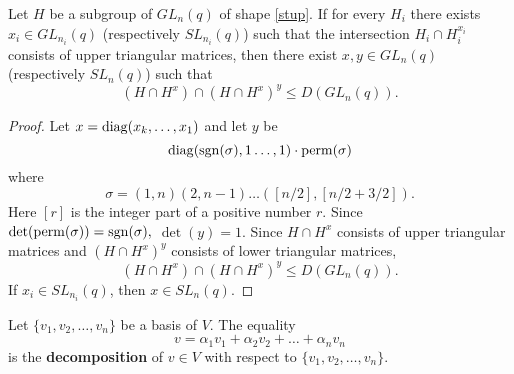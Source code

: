 \begin{Lem}\label{irrtog}
Let $H$ be a subgroup of $GL_n(q)$ of shape \eqref{stup}. If for every $H_i$ there exists $x_i \in GL_{n_i}(q)$ (respectively $SL_{n_i}(q)$) such that the intersection $H_i \cap H_i^{x_i}$ consists of upper triangular matrices, then there exist $x,y \in GL_n(q)$ (respectively $SL_n(q)$) such that 
$$(H\cap H^x) \cap (H\cap H^x)^y \le D(GL_n(q)).$$
\end{Lem}
\begin{proof}
Let $x=\mathrm{diag}(x_k, \ldots, x_1)$ and let $y$ be $$\mathrm{diag}(\mathrm{sgn}(\sigma),1 \ldots,1) \cdot \mathrm{perm}(\sigma)$$ where  $$\sigma =(1,n)(2, n-1) \ldots ([n/2], [n/2+3/2]).$$ Here $[r]$ is the integer part of a positive number $r$. Since $\det(\mathrm{perm}(\sigma))=\mathrm{sgn}(\sigma),$ $\det(y)=1.$ Since
$H\cap H^x$ consists of upper triangular matrices and $(H\cap H^x)^y$ consists of lower triangular matrices, 
\begin{equation*}
(H\cap H^x) \cap (H\cap H^x)^y \le D(GL_n(q)). %
\end{equation*} 
If $x_i \in SL_{n_i}(q)$, then $x \in SL_n(q).$ %
\end{proof}




\begin{Def}
Let $\{v_1, v_2, \ldots,  v_n \}$ be a basis of $V$. The equality 
$$v=\alpha_1v_1+ \alpha_2v_2+  \ldots+ \alpha_nv_n $$ 
is the {\bf decomposition}  of $v \in V$ with respect to $\{v_1, v_2, \ldots,  v_n \}$.
 \end{Def}


